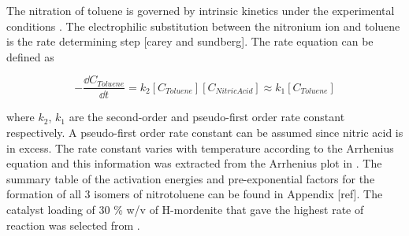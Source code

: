 The nitration of toluene is governed by intrinsic kinetics under the experimental conditions \cite{jeeru_kinetics_2018}. The electrophilic substitution between the  nitronium ion and toluene is the rate determining step [carey and sundberg]. The rate equation can be defined as  

\begin{equation}
-\frac{\dd C_{Toluene}}{\dd t} = k_{2} [C_{Toluene}] [C_{Nitric Acid}] \approx k_{1} [C_{Toluene}]
\end{equation}

where $k_2$, $k_1$ are the second-order and pseudo-first order rate constant respectively. A pseudo-first order rate constant can be assumed since nitric acid is in excess. The rate constant varies with temperature according to the Arrhenius equation and this information was extracted from the Arrhenius plot in \textcite{jeeru_kinetics_2018}. The summary table of the activation energies and pre-exponential factors for the formation of all 3 isomers of nitrotoluene can be found in Appendix [ref]. The catalyst loading of 30 \% w/v of H-mordenite that gave the highest rate of reaction was selected from \textcite{jeeru_kinetics_2018}.





